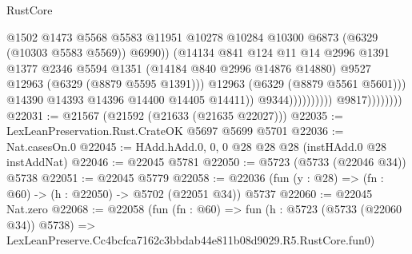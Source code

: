 \begin{lexlean}{RustCore}
\begin{coremodule}
                                                  @1502
                                                  @1473
                                                  @5568
                                                  @5583
                                                  @11951
                                                  @10278
                                                  @10284
                                                  @10300
                                                  @6873
                                                  (@6329 (@10303 @5583 @5569))
                                                  @6990))
                                              (@14134
                                                @841
                                                @124
                                                @11
                                                @14
                                                @2996
                                                @1391
                                                @1377
                                                @2346
                                                @5594
                                                @1351
                                                (@14184 @840 @2996 @14876 @14880)
                                                @9527
                                                @12963
                                                (@6329 (@8879 @5595 @1391)))
                                              @12963
                                              (@6329 (@8879 @5561 @5601)))
                                            @14390
                                            @14393
                                            @14396
                                            @14400
                                            @14405
                                            @14411))
                                        @9344))))))))))
                    @9817))))))))
@22031 := @21567 (@21592 (@21633 (@21635 @22027)))
@22035 := LexLeanPreservation.Rust.CrateOK @5697 @5699 @5701
@22036 := Nat.casesOn.{0}
@22045 := HAdd.hAdd.{0, 0, 0} @28 @28 @28 (instHAdd.{0} @28 instAddNat)
@22046 := @22045 @5781
@22050 := @5723 (@5733 (@22046 @34)) @5738
@22051 := @22045 @5779
@22058 := @22036 (fun (y : @28) => (fn : @60) -> (h : @22050) -> @5702 (@22051 @34)) @5737
@22060 := @22045 Nat.zero
@22068 := @22058
    (fun (fn : @60) =>
    fun (h : @5723 (@5733 (@22060 @34)) @5738) =>
    LexLeanPreserve.Cc4bcfca7162c3bbdab44e811b08d9029.R5.RustCore.fun0)

\end{coremodule}
\end{lexlean}

